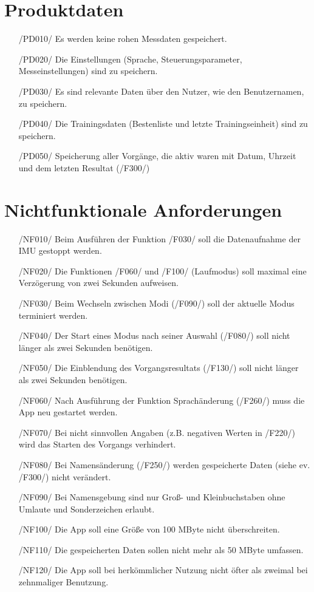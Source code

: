 \documentclass[a4paper,12pt]{article}
\begin{document}
\section{Produktdaten}
\begin{itemize}
	\item[/PD010/] Es werden keine rohen Messdaten gespeichert.
	\item[/PD020/] Die Einstellungen (Sprache, Steuerungsparameter, Messeinstellungen) sind zu speichern. 
	\item[/PD030/] Es sind relevante Daten über den Nutzer, wie den Benutzernamen, zu speichern.
	\item[/PD040/] Die Trainingsdaten (Bestenliste und letzte Trainingseinheit) sind zu speichern. %
	\item[/PD050/] Speicherung aller Vorgänge, die aktiv waren mit Datum, Uhrzeit und dem letzten Resultat (/F300/)%
\end{itemize}


\section{Nichtfunktionale Anforderungen}

\begin{itemize}
  \item[/NF010/] Beim Ausführen der Funktion /F030/ soll die Datenaufnahme der IMU gestoppt werden.
  \item[/NF020/] Die Funktionen /F060/ und /F100/ (Laufmodus) soll maximal eine Verzögerung von zwei Sekunden aufweisen. %
  \item[/NF030/] Beim Wechseln zwischen Modi (/F090/) soll der aktuelle Modus terminiert werden.
  \item[/NF040/] Der Start eines Modus nach seiner Auswahl (/F080/) soll nicht länger als zwei Sekunden benötigen. %
  \item[/NF050/] Die Einblendung des Vorgangsresultats (/F130/) soll nicht länger als zwei Sekunden benötigen.%
  \item[/NF060/] Nach Ausführung der Funktion  Sprachänderung (/F260/) muss die App neu gestartet werden.
  \item[/NF070/] Bei nicht sinnvollen Angaben (z.B. negativen Werten in /F220/) wird das Starten des Vorgangs verhindert.
  \item[/NF080/] Bei Namensänderung (/F250/) werden gespeicherte Daten (siehe ev. /F300/) nicht verändert.
  \item[/NF090/] Bei Namensgebung sind nur Groß- und Kleinbuchstaben ohne Umlaute und Sonderzeichen erlaubt.
  \item[/NF100/] Die App soll eine Größe von 100 MByte nicht überschreiten. %
  \item[/NF110/] Die gespeicherten Daten sollen nicht mehr als 50 MByte umfassen. %
  \item[/NF120/] Die App soll bei herkömmlicher Nutzung nicht öfter als zweimal bei zehnmaliger Benutzung. %
\end{itemize}
\end{document}

